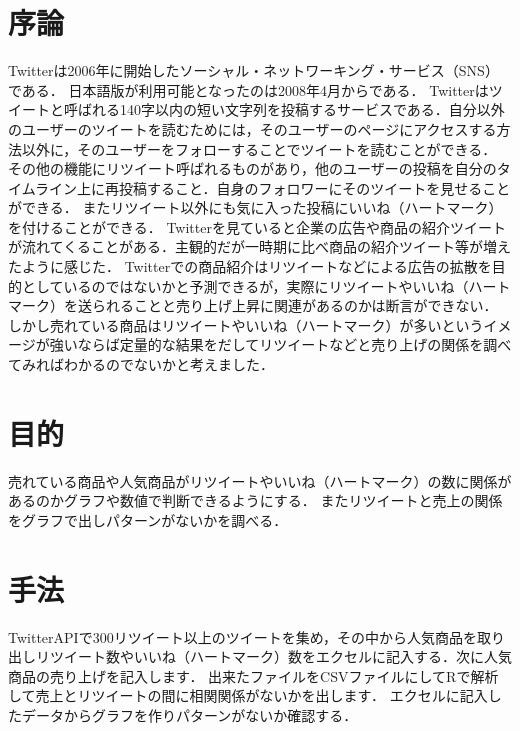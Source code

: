 \documentclass[uplatex,twocolumn,dvipdfmx]{jsarticle}
\title{\vspace{-5mm}\fontsize{14pt}{0pt}\selectfont }
\author{\normalsize ソフトウェアコース　矢吹研究室　1442043　川崎貴雅}
\date{}
\begin{document}
\fontsize{10.5pt}{\baselineskip}\selectfont
\maketitle






\section{序論}
Twitterは2006年に開始したソーシャル・ネットワーキング・サービス（SNS）である．
日本語版が利用可能となったのは2008年4月からである．
Twitterはツイートと呼ばれる140字以内の短い文字列を投稿するサービスである．自分以外のユーザーのツイートを読むためには，そのユーザーのページにアクセスする方法以外に，そのユーザーをフォローすることでツイートを読むことができる．\nocite{bib002}
その他の機能にリツイート呼ばれるものがあり，他のユーザーの投稿を自分のタイムライン上に再投稿すること．自身のフォロワーにそのツイートを見せることができる．
またリツイート以外にも気に入った投稿にいいね（ハートマーク）を付けることができる．
Twitterを見ていると企業の広告や商品の紹介ツイートが流れてくることがある．主観的だが一時期に比べ商品の紹介ツイート等が増えたように感じた．
Twitterでの商品紹介はリツイートなどによる広告の拡散を目的としているのではないかと予測できるが，実際にリツイートやいいね（ハートマーク）を送られることと売り上げ上昇に関連があるのかは断言ができない．
しかし売れている商品はリツイートやいいね（ハートマーク）が多いというイメージが強いならば定量的な結果をだしてリツイートなどと売り上げの関係を調べてみればわかるのでないかと考えました．

\section{目的}

売れている商品や人気商品がリツイートやいいね（ハートマーク）の数に関係があるのかグラフや数値で判断できるようにする．
またリツイートと売上の関係をグラフで出しパターンがないかを調べる．

\section{手法}
TwitterAPIで300リツイート以上のツイートを集め，その中から人気商品を取り出しリツイート数やいいね（ハートマーク）数をエクセルに記入する．次に人気商品の売り上げを記入します．
出来たファイルをCSVファイルにしてRで解析して売上とリツイートの間に相関関係がないかを出します．
エクセルに記入したデータからグラフを作りパターンがないか確認する．
\end{document}

